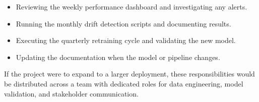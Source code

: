 \begin{itemize}
    \item Reviewing the weekly performance dashboard and investigating any alerts.
    \item Running the monthly drift detection scripts and documenting results.
    \item Executing the quarterly retraining cycle and validating the new model.
    \item Updating the documentation when the model or pipeline changes.
\end{itemize}

\noindent
If the project were to expand to a larger deployment, these responsibilities would be distributed across a team with dedicated roles for data engineering, model validation, and stakeholder communication.
